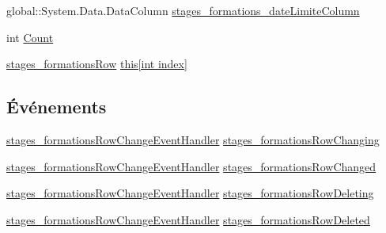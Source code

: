 \begin{DoxyCompactItemize}
\item 
global\+::\+System.\+Data.\+Data\+Column \hyperlink{classforma_1_1formadb_data_set_1_1stages__formations_data_table_a42179e60ee364eba6ae8d74358c649fb}{stages\+\_\+formations\+\_\+date\+Limite\+Column}
\item 
int \hyperlink{classforma_1_1formadb_data_set_1_1stages__formations_data_table_accb1e67c60a3c73ca668f6d93523b825}{Count}
\item 
\hyperlink{classforma_1_1formadb_data_set_1_1stages__formations_row}{stages\+\_\+formations\+Row} \hyperlink{classforma_1_1formadb_data_set_1_1stages__formations_data_table_ad70f26f9ebf4e04bb1ef1fff4503235f}{this\mbox{[}int index\mbox{]}}
\end{DoxyCompactItemize}
\subsection*{Événements}
\begin{DoxyCompactItemize}
\item 
\hyperlink{classforma_1_1formadb_data_set_ae1046a5f2fc242610e2e7e5225c4b780}{stages\+\_\+formations\+Row\+Change\+Event\+Handler} \hyperlink{classforma_1_1formadb_data_set_1_1stages__formations_data_table_aa6812e62b90d0f0aaba61f9cf713156a}{stages\+\_\+formations\+Row\+Changing}
\item 
\hyperlink{classforma_1_1formadb_data_set_ae1046a5f2fc242610e2e7e5225c4b780}{stages\+\_\+formations\+Row\+Change\+Event\+Handler} \hyperlink{classforma_1_1formadb_data_set_1_1stages__formations_data_table_a4f63174aea5c90134928e7523ea175e2}{stages\+\_\+formations\+Row\+Changed}
\item 
\hyperlink{classforma_1_1formadb_data_set_ae1046a5f2fc242610e2e7e5225c4b780}{stages\+\_\+formations\+Row\+Change\+Event\+Handler} \hyperlink{classforma_1_1formadb_data_set_1_1stages__formations_data_table_ae01b9fbd5638846ea868e7982856f7ac}{stages\+\_\+formations\+Row\+Deleting}
\item 
\hyperlink{classforma_1_1formadb_data_set_ae1046a5f2fc242610e2e7e5225c4b780}{stages\+\_\+formations\+Row\+Change\+Event\+Handler} \hyperlink{classforma_1_1formadb_data_set_1_1stages__formations_data_table_adedb4fc467d8fb7aec2ca9ee55ee5e04}{stages\+\_\+formations\+Row\+Deleted}
\end{DoxyCompactItemize}


